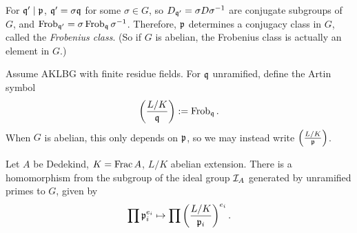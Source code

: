 \documentclass[11pt]{amsart}
\begin{document}
For $\mathfrak{q}'\mid \mathfrak{p}$, $\mathfrak{q}' = \sigma\mathfrak{q}$ for some $\sigma\in G$, so $D_{\mathfrak{q}'} = \sigma D \sigma^{-1}$ are conjugate subgroups of $G$, and $\operatorname{Frob}_{\mathfrak{q}'} = \sigma \operatorname{Frob}_{\mathfrak{q}} \sigma^{-1}$. Therefore, $\mathfrak{p}$ determines a conjugacy class in $G$, called the \emph{Frobenius class}. (So if $G$ is abelian, the Frobenius class is actually an element in $G$.)


\begin{defn}
    Assume AKLBG with finite residue fields. For $\mathfrak{q}$ unramified, define the Artin symbol
    \[\left( \frac{L/K}{\mathfrak{q}} \right) := \operatorname{Frob}_{\mathfrak{q}}.\]
    When $G$ is abelian, this only depends on $\mathfrak{p}$, so we may instead write $\left( \frac{L/K}{\mathfrak{p}} \right)$.
\end{defn}

\begin{defn}
    Let $A$ be Dedekind, $K = \operatorname{Frac} A$, $L/K$ abelian extension. There is a homomorphism from the subgroup of the ideal group $\mathcal{I}_A$ generated by unramified primes to $G$, given by
    \[\prod \mathfrak{p}_i^{e_i} \mapsto \prod\left( \frac{L/K}{\mathfrak{p}_i} \right)^{e_i}.\]
\end{defn}
\end{document}
